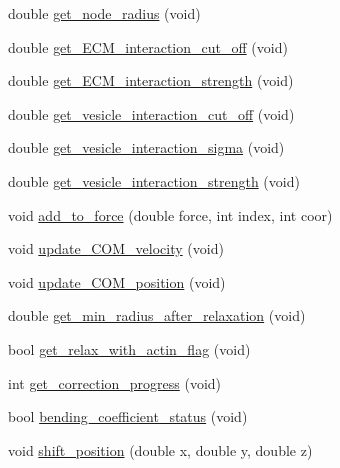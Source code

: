 \begin{DoxyCompactItemize}
double \mbox{\hyperlink{classMembrane_a55c6aba6d26420c0796841125e2a6b98}{get\+\_\+node\+\_\+radius}} (void)
\item 
double \mbox{\hyperlink{classMembrane_a7e615d274c66563e37113d33a53d3a0b}{get\+\_\+\+E\+C\+M\+\_\+interaction\+\_\+cut\+\_\+off}} (void)
\item 
double \mbox{\hyperlink{classMembrane_a21875eb94e7bce97b45bd18b3461d8fc}{get\+\_\+\+E\+C\+M\+\_\+interaction\+\_\+strength}} (void)
\item 
double \mbox{\hyperlink{classMembrane_ac8de522542c4c2c68ea489ce13a79bb5}{get\+\_\+vesicle\+\_\+interaction\+\_\+cut\+\_\+off}} (void)
\item 
double \mbox{\hyperlink{classMembrane_a42b4b787240cc27329218909bf790409}{get\+\_\+vesicle\+\_\+interaction\+\_\+sigma}} (void)
\item 
double \mbox{\hyperlink{classMembrane_a77171793ae4115a603f57f3472868ff8}{get\+\_\+vesicle\+\_\+interaction\+\_\+strength}} (void)
\item 
void \mbox{\hyperlink{classMembrane_a7524333ddca2039be9931fad57135fad}{add\+\_\+to\+\_\+force}} (double force, int index, int coor)
\item 
void \mbox{\hyperlink{classMembrane_aa1bb3ec5f5b6c6451e2f72103fbdde08}{update\+\_\+\+C\+O\+M\+\_\+velocity}} (void)
\item 
void \mbox{\hyperlink{classMembrane_ad7368b7721d9279f54a7dece975ee152}{update\+\_\+\+C\+O\+M\+\_\+position}} (void)
\item 
double \mbox{\hyperlink{classMembrane_a629f4f8d87ef7b83130cf18e8de060bb}{get\+\_\+min\+\_\+radius\+\_\+after\+\_\+relaxation}} (void)
\item 
bool \mbox{\hyperlink{classMembrane_a3030a224f8b882e0bdec2d1fd6861304}{get\+\_\+relax\+\_\+with\+\_\+actin\+\_\+flag}} (void)
\item 
int \mbox{\hyperlink{classMembrane_ad3960f87e60282211a1266f4d3318dc0}{get\+\_\+correction\+\_\+progress}} (void)
\item 
bool \mbox{\hyperlink{classMembrane_af1621cec0f4c59ded7978719e64c6d39}{bending\+\_\+coefficient\+\_\+status}} (void)
\item 
void \mbox{\hyperlink{classMembrane_aae01bd33119728d0b268081bee3815e7}{shift\+\_\+position}} (double x, double y, double z)
\end{DoxyCompactItemize}
